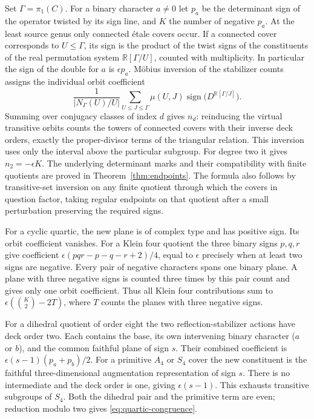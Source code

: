 Set \(\Gamma=\pi_1(C)\). For a binary character \(a\ne0\) let \(p_a\) be the determinant sign of the operator twisted by its sign line, and \(K\) the number of negative \(p_a\). At the least source genus only connected étale covers occur. If a connected cover corresponds to \(U\le\Gamma\), its sign is the product of the twist signs of the constituents of the real permutation system \(\mathbb R[\Gamma/U]\), counted with multiplicity. In particular the sign of the double for \(a\) is \(\epsilon p_a\). Möbius inversion of the stabilizer counts assigns the individual orbit coefficient
\[\frac1{|N_\Gamma(U)/U|}\sum_{U\le J\le\Gamma}
                \mu(U,J)\operatorname{sign}\big(D^{\mathbb R[\Gamma/J]}\big).\]
Summing over conjugacy classes of index \(d\) gives \(n_d\): reinducing the virtual transitive orbits counts the towers of connected covers with their inverse deck orders, exactly the proper-divisor terms of the triangular relation. This inversion uses only the interval above the particular subgroup. For degree two it gives \(n_2=-\epsilon K\). The underlying determinant marks and their compatibility with finite quotients are proved in Theorem~\ref{thm:endpoints}. The formula also follows by transitive-set inversion on any finite quotient through which the covers in question factor, taking regular endpoints on that quotient after a small perturbation preserving the required signs.

For a cyclic quartic, the new plane is of complex type and has positive sign. Its orbit coefficient vanishes. For a Klein four quotient the three binary signs \(p,q,r\) give coefficient \(\epsilon(pqr-p-q-r+2)/4\), equal to \(\epsilon\) precisely when at least two signs are negative. Every pair of negative characters spans one binary plane. A plane with three negative signs is counted three times by this pair count and gives only one orbit coefficient. Thus all Klein four contributions sum to \(\epsilon(\binom K2-2T)\), where \(T\) counts the planes with three negative signs.

For a dihedral quotient of order eight the two reflection-stabilizer actions have deck order two. Each contains the base, its own intervening binary character (\(a\) or \(b\)), and the common faithful plane of sign \(s\). Their combined coefficient is \(\epsilon(s-1)(p_a+p_b)/2\). For a primitive \(A_4\) or \(S_4\) cover the new constituent is the faithful three-dimensional augmentation representation of sign \(s\). There is no intermediate and the deck order is one, giving \(\epsilon(s-1)\). This exhausts transitive subgroups of \(S_4\). Both the dihedral pair and the primitive term are even; reduction modulo two gives \eqref{eq:quartic-congruence}.

